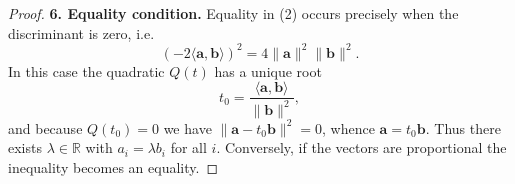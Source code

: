 \begin{proof}
\textbf{6. Equality condition.}  
Equality in (2) occurs precisely when the discriminant is zero, i.e.
\[
(-2\langle\mathbf a,\mathbf b\rangle)^{2}=4\|\mathbf a\|^{2}\|\mathbf b\|^{2}.
\]
In this case the quadratic $Q(t)$ has a unique root
\[
t_{0}= \frac{\langle\mathbf a,\mathbf b\rangle}{\|\mathbf b\|^{2}},
\]
and because $Q(t_{0})=0$ we have $\|\mathbf a-t_{0}\mathbf b\|^{2}=0$, whence $\mathbf a=t_{0}\mathbf b$.  
Thus there exists $\lambda\in\mathbb R$ with $a_i=\lambda b_i$ for all $i$.  
Conversely, if the vectors are proportional the inequality becomes an equality.
\end{proof}